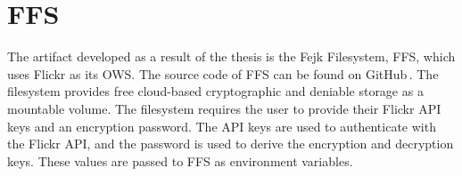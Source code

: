 \section{FFS}
\label{sec:res_ffs}
The artifact developed as a result of the thesis is the Fejk Filesystem, FFS, which uses Flickr as its OWS. The source code of FFS can be found on GitHub\,\cite{olssonFejkFileSystem2022}. The filesystem provides free cloud-based cryptographic and deniable storage as a mountable volume. The filesystem requires the user to provide their Flickr API keys and an encryption password. The API keys are used to authenticate with the Flickr API, and the password is used to derive the encryption and decryption keys. These values are passed to FFS as environment variables.